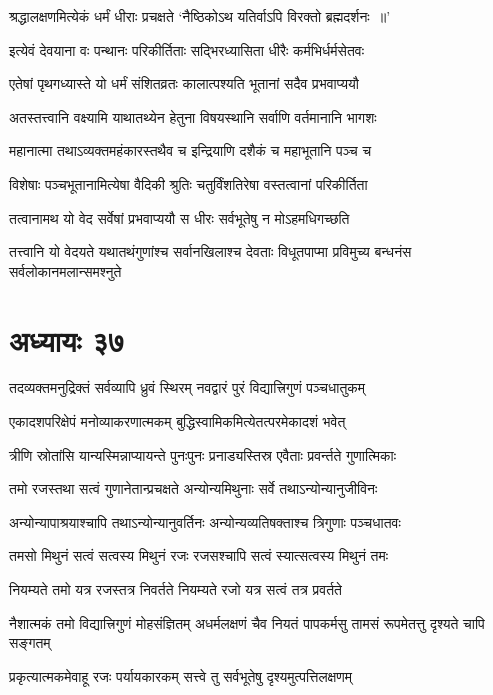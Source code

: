 \twolineshloka
{श्रद्धालक्षणमित्येकं धर्मं धीराः प्रचक्षते}
{`नैष्ठिकोऽथ यतिर्वाऽपि विरक्तो ब्रह्मदर्शनः ॥'}


\twolineshloka
{इत्येवं देवयाना वः पन्थानः परिकीर्तिताः}
{सद्भिरध्यासिता धीरैः कर्मभिर्धर्मसेतवः}


\twolineshloka
{एतेषां पृथगध्यास्ते यो धर्मं संशितव्रतः}
{कालात्पश्यति भूतानां सदैव प्रभवाप्ययौ}


\twolineshloka
{अतस्तत्त्वानि वक्ष्यामि याथातथ्येन हेतुना}
{विषयस्थानि सर्वाणि वर्तमानानि भागशः}


\twolineshloka
{महानात्मा तथाऽव्यक्तमहंकारस्तथैव च}
{इन्द्रियाणि दशैकं च महाभूतानि पञ्च च}


\twolineshloka
{विशेषाः पञ्चभूतानामित्येषा वैदिकी श्रुतिः}
{चतुर्विंशतिरेषा वस्तत्वानां परिकीर्तिता}


\twolineshloka
{तत्वानामथ यो वेद सर्वेषां प्रभवाप्ययौ}
{स धीरः सर्वभूतेषु न मोऽहमधिगच्छति}


\twolineshloka
{तत्त्वानि यो वेदयते यथातथंगुणांश्च सर्वानखिलाश्च देवताः}
{विधूतपाप्मा प्रविमुच्य बन्धनंस सर्वलोकानमलान्समश्नुते}


\chapter{अध्यायः ३७}
\twolineshloka
{तदव्यक्तमनुद्रिक्तं सर्वव्यापि ध्रुवं स्थिरम्}
{नवद्वारं पुरं विद्यात्त्रिगुणं पञ्चधातुकम्}


\twolineshloka
{एकादशपरिक्षेपं मनोव्याकरणात्मकम्}
{बुद्धिस्वामिकमित्येतत्परमेकादशं भवेत्}


\twolineshloka
{त्रीणि स्रोतांसि यान्यस्मिन्नाप्यायन्ते पुनःपुनः}
{प्रनाड्यस्तिस्र एवैताः प्रवर्न्तते गुणात्मिकाः}


\twolineshloka
{तमो रजस्तथा सत्वं गुणानेतान्प्रचक्षते}
{अन्योन्यमिथुनाः सर्वे तथाऽन्योन्यानुजीविनः}


\twolineshloka
{अन्योन्यापाश्रयाश्चापि तथाऽन्योन्यानुवर्तिनः}
{अन्योन्यव्यतिषक्ताश्च त्रिगुणाः पञ्चधातवः}


\twolineshloka
{तमसो मिथुनं सत्वं सत्वस्य मिथुनं रजः}
{रजसश्चापि सत्वं स्यात्सत्वस्य मिथुनं तमः}


\twolineshloka
{नियम्यते तमो यत्र रजस्तत्र निवर्तते}
{नियम्यते रजो यत्र सत्वं तत्र प्रवर्तते}


\threelineshloka
{नैशात्मकं तमो विद्यात्त्रिगुणं मोहसंज्ञितम्}
{अधर्मलक्षणं चैव नियतं पापकर्मसु}
{तामसं रूपमेतत्तु दृश्यते चापि सङ्गतम्}


\twolineshloka
{प्रकृत्यात्मकमेवाहू रजः पर्यायकारकम्}
{सत्त्वे तु सर्वभूतेषु दृश्यमुत्पत्तिलक्षणम्}


